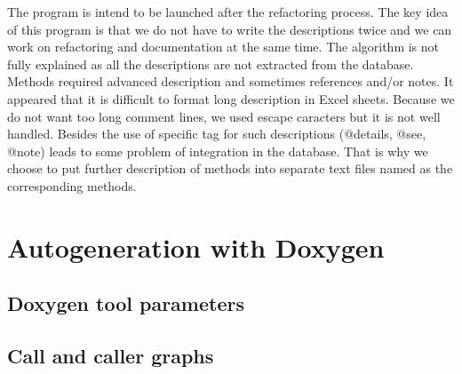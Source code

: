 The program is intend to be launched after the refactoring process. The key idea of this program is that we do not have to write the descriptions twice and we can work on refactoring and documentation at the same time. The algorithm is not fully explained as all the descriptions are not extracted from the database. Methods required advanced description and sometimes references and/or notes. It appeared that it is difficult to format long description in Excel sheets. Because we do not want too long comment lines, we used escape caracters but it is not well handled.  Besides the use of specific tag for such descriptions (@details, @see, @note) leads to some problem of integration in the database. That is why we choose to put further description of methods into separate text files named as the corresponding methods.
\section{Autogeneration with Doxygen}
\subsection{Doxygen tool parameters}
\subsection{Call and caller graphs}